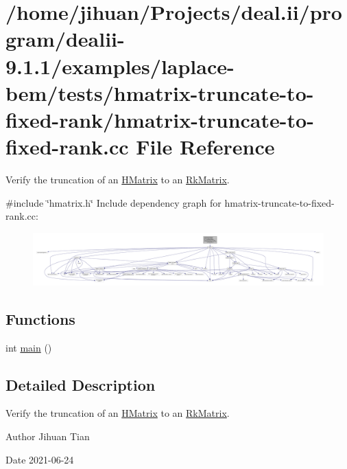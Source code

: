 \hypertarget{hmatrix-truncate-to-fixed-rank_8cc}{}\section{/home/jihuan/\+Projects/deal.ii/program/dealii-\/9.1.1/examples/laplace-\/bem/tests/hmatrix-\/truncate-\/to-\/fixed-\/rank/hmatrix-\/truncate-\/to-\/fixed-\/rank.cc File Reference}
\label{hmatrix-truncate-to-fixed-rank_8cc}


Verify the truncation of an \hyperlink{classHMatrix}{H\+Matrix} to an \hyperlink{classRkMatrix}{Rk\+Matrix}.  


{\ttfamily \#include \char`\"{}hmatrix.\+h\char`\"{}}\newline
Include dependency graph for hmatrix-\/truncate-\/to-\/fixed-\/rank.cc\+:\nopagebreak
\begin{figure}[H]
\begin{center}
\leavevmode
\includegraphics[width=350pt]{hmatrix-truncate-to-fixed-rank_8cc__incl}
\end{center}
\end{figure}
\subsection*{Functions}
\begin{DoxyCompactItemize}
\item 
int \hyperlink{hmatrix-truncate-to-fixed-rank_8cc_ae66f6b31b5ad750f1fe042a706a4e3d4}{main} ()
\end{DoxyCompactItemize}


\subsection{Detailed Description}
Verify the truncation of an \hyperlink{classHMatrix}{H\+Matrix} to an \hyperlink{classRkMatrix}{Rk\+Matrix}. 

\begin{DoxyAuthor}{Author}
Jihuan Tian 
\end{DoxyAuthor}
\begin{DoxyDate}{Date}
2021-\/06-\/24 
\end{DoxyDate}


